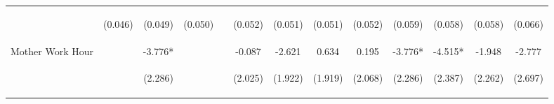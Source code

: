 \begin{tabular}{lcccccccccccc}
 & \begin{footnotesize}(0.046)\end{footnotesize} & \begin{footnotesize}(0.049)\end{footnotesize} & \begin{footnotesize}(0.050)\end{footnotesize} & \begin{footnotesize}\end{footnotesize} & \begin{footnotesize}(0.052)\end{footnotesize} & \begin{footnotesize}(0.051)\end{footnotesize} & \begin{footnotesize}(0.051)\end{footnotesize} & \begin{footnotesize}(0.052)\end{footnotesize} & \begin{footnotesize}(0.059)\end{footnotesize} & \begin{footnotesize}(0.058)\end{footnotesize} & \begin{footnotesize}(0.058)\end{footnotesize} & \begin{footnotesize}(0.066)\end{footnotesize}\\
\noalign{\smallskip}Mother Work Hour &  & -3.776* &  &  & -0.087 & -2.621 & 0.634 & 0.195 & -3.776* & -4.515* & -1.948 & -2.777\\
 & \begin{footnotesize}\end{footnotesize} & \begin{footnotesize}(2.286)\end{footnotesize} & \begin{footnotesize}\end{footnotesize} & \begin{footnotesize}\end{footnotesize} & \begin{footnotesize}(2.025)\end{footnotesize} & \begin{footnotesize}(1.922)\end{footnotesize} & \begin{footnotesize}(1.919)\end{footnotesize} & \begin{footnotesize}(2.068)\end{footnotesize} & \begin{footnotesize}(2.286)\end{footnotesize} & \begin{footnotesize}(2.387)\end{footnotesize} & \begin{footnotesize}(2.262)\end{footnotesize} & \begin{footnotesize}(2.697)\end{footnotesize}\\

\end{tabular}
